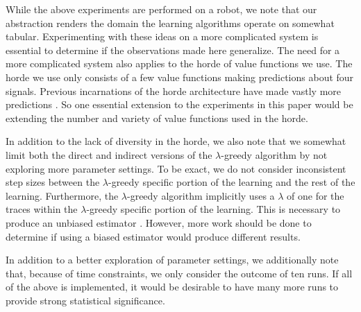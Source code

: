 \documentclass[../main.tex]{subfiles}
\begin{document}
While the above experiments are performed on a robot, we note that our abstraction renders the domain the learning algorithms operate on somewhat tabular. Experimenting with these ideas on a more complicated system is essential to determine if the observations made here generalize. The need for a more complicated system also applies to the horde of value functions we use. The horde we use only consists of a few value functions making predictions about four signals. Previous incarnations of the horde architecture have made vastly more predictions \cite{sutton2011horde}. So one essential extension to the experiments in this paper would be extending the number and variety of value functions used in the horde.

In addition to the lack of diversity in the horde, we also note that we somewhat limit both the direct and indirect versions of the {$\lambda$}-greedy algorithm by not exploring more parameter settings. To be exact, we do not consider inconsistent step sizes between the {$\lambda$}-greedy specific portion of the learning and the rest of the learning. Furthermore, the {$\lambda$}-greedy algorithm implicitly uses a $\lambda$ of one for the traces within the {$\lambda$}-greedy specific portion of the learning. This is necessary to produce an unbiased estimator \cite{white2016greedy}. However, more work should be done to determine if using a biased estimator would produce different results.

In addition to a better exploration of parameter settings, we additionally note that, because of time constraints, we only consider the outcome of ten runs. If all of the above is implemented, it would be desirable to have many more runs to provide strong statistical significance.
\end{document}
